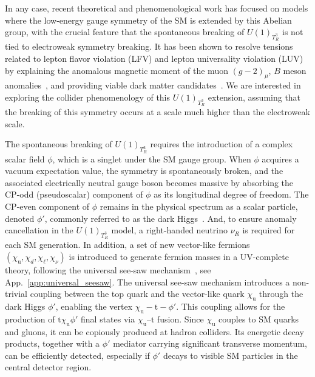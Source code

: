 In any case, recent theoretical and phenomenological work has focused on models where the low-energy gauge symmetry of the SM is extended by this Abelian group, with the crucial feature that the spontaneous breaking of $U(1)_{T^3_R}$ is not tied to electroweak symmetry breaking. It has been shown to resolve tensions related to lepton flavor violation (LFV) and lepton universality violation (LUV) by explaining the anomalous magnetic moment of the muon $(g-2)_\mu$, $B$ meson anomalies~\parencite{Dutta2022}, and providing viable dark matter candidates~\cite{Dutta2019, Dutta2020b, Dutta:2022qvn}. We are interested in exploring the collider phenomenology of this $U(1)_{T^3_R}$ extension, assuming that the breaking of this symmetry occurs at a scale much higher than the electroweak scale.

The spontaneous breaking of $U(1)_{T^3_R}$ requires the introduction of a complex scalar field $\phi$, which is a singlet under the SM gauge group. When $\phi$ acquires a vacuum expectation value, the symmetry is spontaneously broken, and the associated electrically neutral gauge boson becomes massive by absorbing the CP-odd (pseudoscalar) component of $\phi$ as its longitudinal degree of freedom. The CP-even component of $\phi$ remains in the physical spectrum as a scalar particle, denoted $\phi'$, commonly referred to as the dark Higgs~\parencite{DiLuzio2018, Baker2019, Michaels:2020fzj, Dev:2021otb}. And, to ensure anomaly cancellation in the $U(1)_{T^3_R}$ model, a right-handed neutrino $\nu_R$ is required for each SM generation. In addition, a set of new vector-like fermions $(\chi_\mathrm{u}, \chi_d, \chi_\ell, \chi_\nu)$ is introduced to generate fermion masses in a UV-complete theory, following the universal see-saw mechanism~\parencite{Berezhiani, Chang1987, Davidson1987, Rajpoot1987, Babu1989, Babu1990}, see App.~\ref{app:universal_seesaw}. The universal see-saw mechanism introduces a non-trivial coupling between the top quark and the vector-like quark $\chi_\mathrm{u}$ through the dark Higgs $\phi'$, enabling the vertex $\chi_\mathrm{u} - \mathrm{t} -\phi'$. This coupling allows for the production of $\mathrm{t}\chi_\mathrm{u} \phi'$ final states via $\chi_\mathrm{u}$--$\mathrm{t}$ fusion. Since $\chi_\mathrm{u}$ couples to SM quarks and gluons, it can be copiously produced at hadron colliders. Its energetic decay products, together with a $\phi'$ mediator carrying significant transverse momentum, can be efficiently detected, especially if $\phi'$ decays to visible SM particles in the central detector region.

